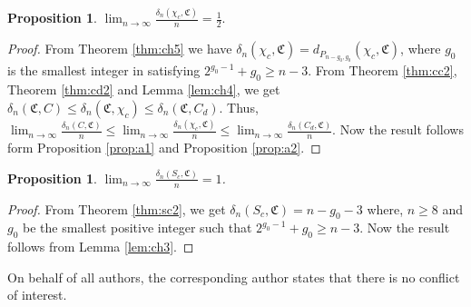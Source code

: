 \documentclass[11pt]{article}
\newtheorem{proposition}[theorem]{Proposition}
\begin{document}
\begin{proposition}\label{prop:a3} 
$\displaystyle\lim_{n \to \infty} \frac{\delta_n(\chi_c,\mathfrak{C})}{n} = \frac{1}{2}.$
\end{proposition}
\begin{proof}
From Theorem \ref{thm:ch5} we have $\delta_n(\chi_c, \mathfrak{C})=d_{P_{n-g_0,g_0}}(\chi_c,\mathfrak{C})$, where $g_0$ is the smallest integer in  satisfying $2^{g_0-1}+g_0\geq n-3$. From Theorem \ref{thm:cc2}, Theorem \ref{thm:cd2} and Lemma \ref{lem:ch4}, we get $\delta_n(\mathfrak{C},C)\leq \delta_n(\mathfrak{C},\chi_c)\leq \delta_n(\mathfrak{C},C_d)$. Thus, $\displaystyle\lim_{n \to \infty}\frac{\delta_n(C,\mathfrak{C})}{n}\leq \displaystyle\lim_{n \to \infty}\frac{\delta_n(\chi_c, \mathfrak{C})}{n}\leq \displaystyle\lim_{n \to \infty}\frac{\delta_n(C_d,\mathfrak{C})}{n}$. Now the result follows form Proposition \ref{prop:a1} and Proposition \ref{prop:a2}.
\end{proof}
\begin{proposition}\label{prop:a4}
$\displaystyle\lim_{n \to \infty} \frac{\delta_n(S_c,\mathfrak{C})}{n} = 1$.
\end{proposition}
\begin{proof}
From Theorem \ref{thm:sc2}, we get $\delta_n(S_c,\mathfrak{C})=n-g_0-3$ where, $n\geq 8$ and $g_0$ be the smallest positive integer such that  $2^{g_0-1}+g_0\geq n-3$. Now the result follows from Lemma \ref{lem:ch3}.
\end{proof}


 On behalf of all authors, the corresponding author states that there is no conflict of interest.
\end{document}
